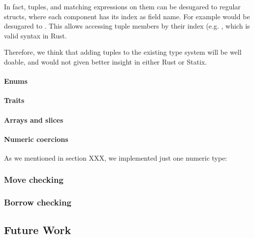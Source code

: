 In fact, tuples, and matching expressions on them can be desugared to regular structs, where each component has its index as field name. For example  would be desugared to . This allows accessing tuple members by their index (e.g. , which is valid syntax in Rust.

Therefore, we think that adding tuples to the existing type system will be well doable, and would not given better insight in either Rust or Statix.

\paragraph{Enums}


\paragraph{Traits}

\paragraph{Arrays and slices}

\paragraph{Numeric coercions}

As we mentioned in section XXX, we implemented just one numeric type: 

\subsubsection{Move checking}


\subsubsection{Borrow checking}


\subsection{Future Work}\label{s:future_work}
